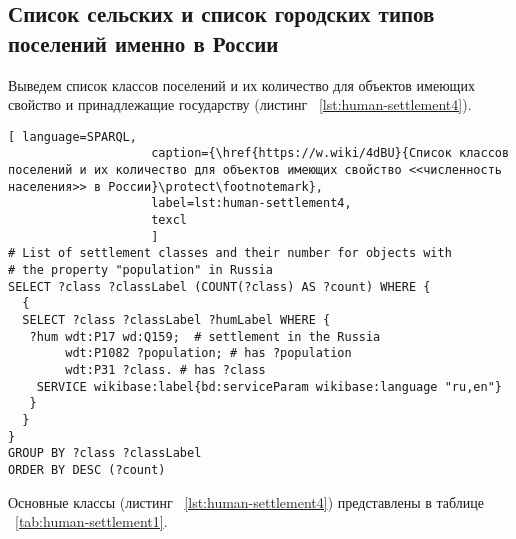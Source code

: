 \subsection{Список сельских и список городских типов поселений именно в России}

Выведем список классов поселений и их количество для объектов имеющих свойство  и принадлежащие государству  (листинг ~\protect\ref{lst:human-settlement4}). 

\begin{lstlisting}[ language=SPARQL, 
                    caption={\href{https://w.wiki/4dBU}{Список классов поселений и их количество для объектов имеющих свойство <<численность населения>> в России}\protect\footnotemark},
                    label=lst:human-settlement4,
                    texcl 
                    ]
# List of settlement classes and their number for objects with 
# the property "population" in Russia
SELECT ?class ?classLabel (COUNT(?class) AS ?count) WHERE {
  {
  SELECT ?class ?classLabel ?humLabel WHERE {
   ?hum wdt:P17 wd:Q159;  # settlement in the Russia
        wdt:P1082 ?population; # has ?population
        wdt:P31 ?class. # has ?class
    SERVICE wikibase:label{bd:serviceParam wikibase:language "ru,en"}
   }
  }
}
GROUP BY ?class ?classLabel
ORDER BY DESC (?count)
\end{lstlisting}%

Основные классы (листинг ~\protect\ref{lst:human-settlement4}) представлены в таблице ~\ref{tab:human-settlement1}.


